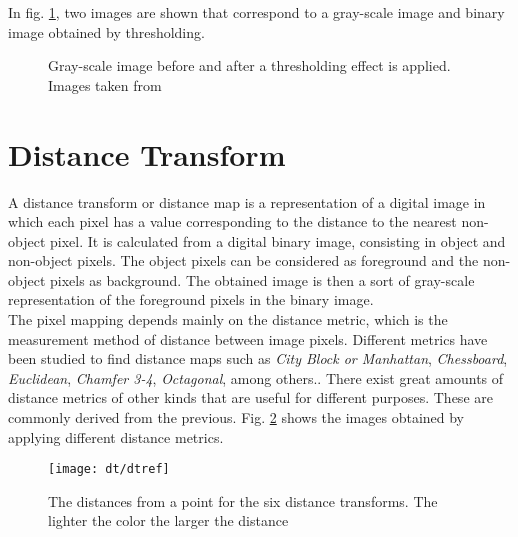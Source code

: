 In fig. \ref{fig:thres1}, two images are shown that correspond to a gray-scale image
and binary image obtained by thresholding.

\begin{figure}[h t b p ! H]
  \centering
\qquad
  \caption[Gray-scale image before and after a thresholding effect is applied]{Gray-scale image before and after a thresholding effect is applied. Images taken from \cite{web:thresholding}}
  \label{fig:thres1}
\end{figure}

\section{Distance Transform}
\label{sec:dt}

A distance transform or distance map is a representation of a digital image
in which each pixel has a value corresponding to the distance to the 
nearest non-object pixel. It is calculated from a digital binary image, 
consisting in object and non-object pixels. The object 
pixels can be considered as foreground and the non-object pixels as
background. The obtained image is then a sort of gray-scale representation
of the foreground pixels in the binary image.\\
The pixel mapping depends mainly on the distance metric, which is the 
measurement method of distance between image pixels. Different metrics have been 
studied to find distance maps such as 
\emph{City Block or Manhattan},
\emph{Chessboard}, \emph{Euclidean}, \emph{Chamfer 3-4}, \emph{Octagonal}, among
others.\cite[p.363]{dtresearch}. There exist great amounts of
distance metrics of other kinds that are useful for different purposes.
These are commonly derived from the previous.
Fig. \ref{fig:dtexamples} shows the images obtained by applying different distance metrics.

\begin{figure}[h t b p ! H]
 \centering
   \texttt{[image: dt/dtref]}
 \caption[The distances from a point for the six distance transforms]{The distances from a point for the six distance transforms.
 The lighter the color the larger the distance \cite[p.365]{dtresearch}}
 \label{fig:dtexamples}
\end{figure}

